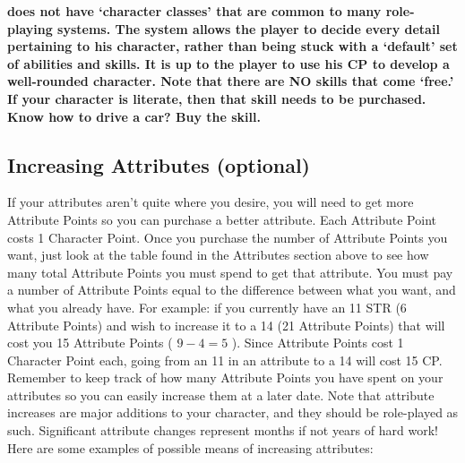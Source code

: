 \documentclass[twoside]{book}
\begin{document}
 \textbf{\APATHY{}  does not have `character
              classes' that are common to many role-playing
              systems. The \APATHY{}  system allows the player to decide
              every detail pertaining to his character, rather than being
              stuck with a `default' set of abilities and
              skills. It is up to the player to use his CP to develop a
              well-rounded character. Note that there are NO skills that
              come `free.' If your character is literate,
              then that skill needs to be purchased. Know how to drive a
              car? Buy the skill.
            }


    

\subsection{Increasing Attributes (optional)}
     If your attributes aren't quite where you
               desire, you will need to get more Attribute Points so you
               can purchase a better attribute. Each Attribute Point
               costs 1 Character Point. Once you purchase the number of
               Attribute Points you want, just look at the table found in
               the Attributes section above to see how many total
               Attribute Points you must spend to get that attribute.
                You must pay a number of Attribute Points equal to
              the difference between what you want, and what you already
              have. For example: if you currently have an 11 STR (6
              Attribute Points) and wish to increase it to a 14 (21
              Attribute Points) that will cost you 15 Attribute Points (
              \ensuremath{ 9  -  4  =
               5 } ). Since Attribute Points cost
              1 Character Point each, going from an 11 in an attribute to
              a 14 will cost 15 CP.
             Remember to keep track of how many Attribute Points
               you have spent on your attributes so you can easily
               increase them at a later date.  Note that attribute increases are major additions to
               your character, and they should be role-played as such.
               Significant attribute changes represent months if not
               years of hard work! Here are some examples of possible
               means of increasing attributes: 
\end{document}
